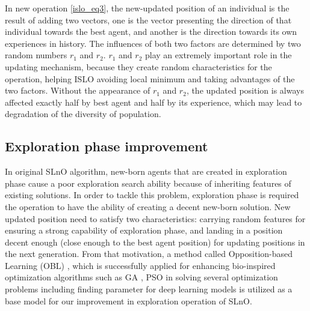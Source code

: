 \documentclass[a4paper,13pt,2p]{report}
\begin{document}
	In new operation \ref{islo_eq3}, the new-updated position of an individual is the result of adding two vectors, one is the vector presenting the direction of that individual towards the best agent, and another is the direction towards its own experiences in history. The influences of both two factors are determined by two random numbers $r_1$ and $r_2$. $r_1$ and $r_2$ play an extremely important role in the updating mechanism,  because  they create random characteristics for the operation, helping ISLO avoiding local minimum and taking advantages of the two factors. Without the appearance of $r_1$ and $r_2$, the updated position is always affected exactly half by best agent and half by its experience, which may lead to degradation of the diversity of population. 

\subsection{Exploration phase improvement}
\label{imprv_explore}
	
	In original SLnO algorithm, new-born agents that are created in exploration phase cause a poor exploration search ability because of inheriting features of existing solutions. In order to tackle this problem, exploration phase is required the operation to have the ability of creating a decent new-born solution. New updated position need to satisfy two characteristics: carrying random features for ensuring a strong capability of exploration phase, and landing in a position decent enough (close enough to the best agent position) for updating positions in the next generation. From that motivation, a method called Opposition-based Learning (OBL) \cite{tizhoosh2005opposition}, which is successfully applied for enhancing bio-inspired optimization algorithms such as GA \cite{tizhoosh2005opposition}, PSO \cite{wang2007opposition} \cite{tang2009enhanced} in solving several optimization problems including finding parameter for deep learning models \cite{rashid2010improved} \cite{nguyen2019efficient} is utilized as a base model for our improvement in exploration operation of SLnO. 
	
\end{document}
